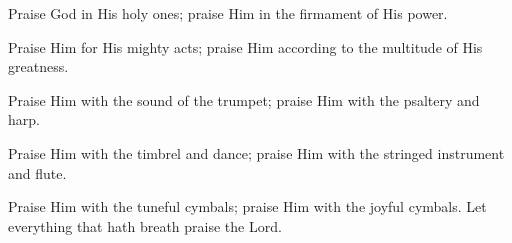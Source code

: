 Praise God in His holy ones; praise Him in the firmament of His power.

Praise Him for His mighty acts; praise Him according to the multitude of His greatness.

Praise Him with the sound of the trumpet; praise Him with the psaltery and harp.

Praise Him with the timbrel and dance; praise Him with the stringed instrument and flute.

Praise Him with the tuneful cymbals; praise Him with the joyful cymbals. Let everything that hath breath praise the Lord.
